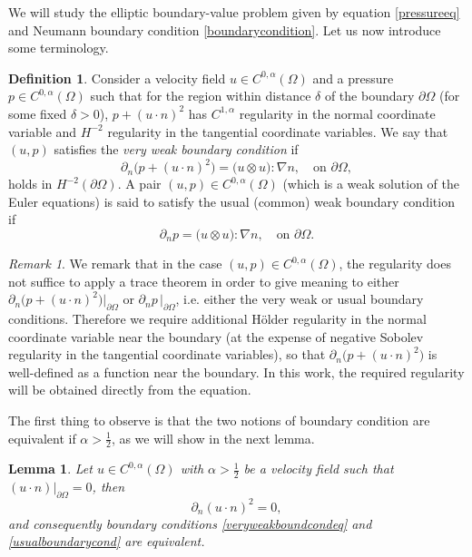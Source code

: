 \documentclass[12pt,a4paper]{article}
\newtheorem{lemma}[theorem]{Lemma}
\theoremstyle{definition}
\newtheorem{definition}[theorem]{Definition}
\theoremstyle{remark}
\newtheorem{remark}[theorem]{Remark}
\numberwithin{equation}{section}
\begin{document}
We will study the elliptic boundary-value problem given by equation \eqref{pressureeq} and Neumann boundary condition \eqref{boundarycondition}. Let us now introduce some terminology.
\begin{definition} \label{veryweakboundconddef}
Consider a velocity field $u \in C^{0,\alpha} (\Omega)$ and a pressure $p \in C^{0,\alpha} (\Omega)$ such that for the region within distance $\delta$ of the boundary $\partial \Omega$ (for some fixed $\delta > 0$), $p + (u \cdot n)^2$ has $C^{1,\alpha}$ regularity in the normal coordinate variable and $H^{-2}$ regularity in the tangential coordinate variables. We say that $(u,p)$ satisfies the \emph{very weak boundary condition} if 
\begin{equation} \label{veryweakboundcondeq}
\partial_n \big( p + (u \cdot n)^2 \big) = \big( u \otimes u \big) : \nabla n, \quad \text{on } \partial \Omega,
\end{equation}
holds in $H^{-2} (\partial \Omega)$. A pair $(u,p) \in C^{0,\alpha} (\Omega)$ (which is a weak solution of the Euler equations) is said to satisfy the usual (common) weak boundary condition if
\begin{equation} \label{usualboundarycond}
\partial_n p = \big( u \otimes u \big) : \nabla n, \quad \text{on } \partial \Omega.
\end{equation}
\end{definition}
\begin{remark}
We remark that in the case $(u,p) \in C^{0,\alpha} (\Omega)$, the regularity does not suffice to apply a trace theorem in order to give meaning to either $\partial_n \big( p + (u \cdot n)^2 \big) \lvert_{\partial \Omega}$ or $\partial_n p \, \lvert_{\partial \Omega}$, i.e. either the very weak or usual boundary conditions. Therefore we require additional Hölder regularity in the normal coordinate variable near the boundary (at the expense of negative Sobolev regularity in the tangential coordinate variables), so that $\partial_n \big( p + (u \cdot n)^2 \big)$ is well-defined as a function near the boundary. In this work, the required regularity will be obtained directly from the equation.
\end{remark}
The first thing to observe is that the two notions of boundary condition are equivalent if $\alpha > \frac{1}{2}$, as we will show in the next lemma.
\begin{lemma} \label{equivalencelemma}
Let $u \in C^{0,\alpha} (\Omega)$ with $\alpha > \frac{1}{2}$ be a velocity field such that $(u \cdot n) \lvert_{\partial \Omega} = 0$, then
\begin{equation}
\partial_n (u \cdot n)^2 = 0,
\end{equation}
and consequently boundary conditions \eqref{veryweakboundcondeq} and \eqref{usualboundarycond} are equivalent.
\end{lemma}
\end{document}
